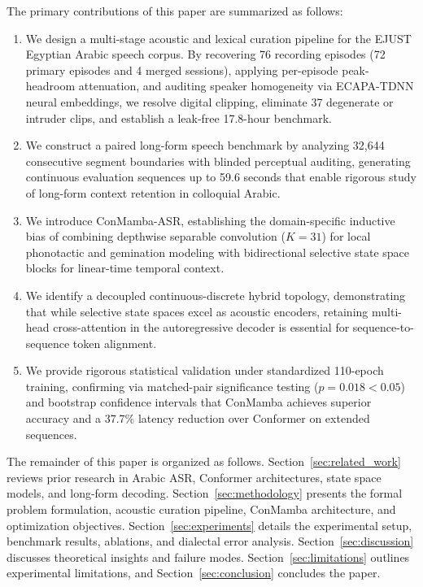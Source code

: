\documentclass[journal]{IEEEtran}
\begin{document}
The primary contributions of this paper are summarized as follows:
\begin{enumerate}
    \item We design a multi-stage acoustic and lexical curation pipeline for the EJUST Egyptian Arabic speech corpus. By recovering 76 recording episodes (72 primary episodes and 4 merged sessions), applying per-episode peak-headroom attenuation, and auditing speaker homogeneity via ECAPA-TDNN neural embeddings, we resolve digital clipping, eliminate 37 degenerate or intruder clips, and establish a leak-free 17.8-hour benchmark.
    \item We construct a paired long-form speech benchmark by analyzing 32,644 consecutive segment boundaries with blinded perceptual auditing, generating continuous evaluation sequences up to 59.6 seconds that enable rigorous study of long-form context retention in colloquial Arabic.
    \item We introduce ConMamba-ASR, establishing the domain-specific inductive bias of combining depthwise separable convolution ($K=31$) for local phonotactic and gemination modeling with bidirectional selective state space blocks for linear-time temporal context.
    \item We identify a decoupled continuous-discrete hybrid topology, demonstrating that while selective state spaces excel as acoustic encoders, retaining multi-head cross-attention in the autoregressive decoder is essential for sequence-to-sequence token alignment.
    \item We provide rigorous statistical validation under standardized 110-epoch training, confirming via matched-pair significance testing ($p = 0.018 < 0.05$) and bootstrap confidence intervals that ConMamba achieves superior accuracy and a 37.7\% latency reduction over Conformer on extended sequences.
\end{enumerate}

The remainder of this paper is organized as follows. Section~\ref{sec:related_work} reviews prior research in Arabic ASR, Conformer architectures, state space models, and long-form decoding. Section~\ref{sec:methodology} presents the formal problem formulation, acoustic curation pipeline, ConMamba architecture, and optimization objectives. Section~\ref{sec:experiments} details the experimental setup, benchmark results, ablations, and dialectal error analysis. Section~\ref{sec:discussion} discusses theoretical insights and failure modes. Section~\ref{sec:limitations} outlines experimental limitations, and Section~\ref{sec:conclusion} concludes the paper.
\end{document}
